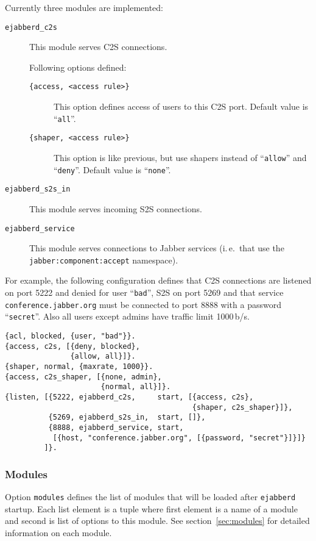 \documentclass[10pt]{article}
\newcommand{\ejabberd}{\texttt{ejabberd}}
\newcommand{\Jabber}{Jabber}
\begin{document}
Currently three modules are implemented:
\begin{description}
\item[\texttt{ejabberd\_c2s}] This module serves C2S connections.
  
  Following options defined:
  \begin{description}
  \item[\texttt{\{access, <access rule>\}}] This option defines access of users
    to this C2S port.  Default value is ``\texttt{all}''.
  \item[\texttt{\{shaper, <access rule>\}}] This option is like previous, but
    use shapers instead of ``\texttt{allow}'' and ``\texttt{deny}''.  Default
    value is ``\texttt{none}''.
  \end{description}
\item[\texttt{ejabberd\_s2s\_in}] This module serves incoming S2S connections.
\item[\texttt{ejabberd\_service}] This module serves connections to \Jabber{}
  services (i.\,e.\ that use the \texttt{jabber:component:accept} namespace).
\end{description}

For example, the following configuration defines that C2S connections are
listened on port 5222 and denied for user ``\texttt{bad}'', S2S on port 5269
and that service \texttt{conference.jabber.org} must be connected to port 8888
with a password ``\texttt{secret}''.  Also all users except admins have traffic
limit 1000\,b/s.
\begin{verbatim}
{acl, blocked, {user, "bad"}}.
{access, c2s, [{deny, blocked},
               {allow, all}]}.
{shaper, normal, {maxrate, 1000}}.
{access, c2s_shaper, [{none, admin},
                      {normal, all}]}.
{listen, [{5222, ejabberd_c2s,     start, [{access, c2s},
                                           {shaper, c2s_shaper}]},
          {5269, ejabberd_s2s_in,  start, []},
          {8888, ejabberd_service, start,
           [{host, "conference.jabber.org", [{password, "secret"}]}]}
         ]}.
\end{verbatim}




\subsubsection{Modules}
\label{sec:configmodules}

Option \texttt{modules} defines the list of modules that will be loaded after
\ejabberd{} startup.  Each list element is a tuple where first element is a
name of a module and second is list of options to this module.  See
section~\ref{sec:modules} for detailed information on each module.
\end{document}
